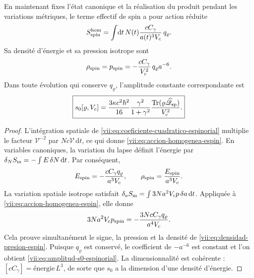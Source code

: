 \begin{theorem}
\label{vii:thm:amplitud-material-explicita}
En maintenant fixes l'état canonique et la réalisation du produit
pendant les variations métriques, le terme effectif de spin a pour
action réduite
\begin{equation}
 S_{\rm spin}^{\rm hom}
 =\int\!\mathrm dt\,N(t)
       \frac{cC_\gamma}{a(t)^3V_c}\,q_\varrho.
 \label{vii:eq:accion-homogenea-espin}
\end{equation}
Sa densité d'énergie et sa pression isotrope sont
\begin{equation}
 \rho_{\rm spin}=p_{\rm spin}
 =-\frac{cC_\gamma}{V_c^2}\,q_\varrho a^{-6}.
 \label{vii:eq:densidad-presion-espin}
\end{equation}
Dans toute évolution qui conserve \(q_\varrho\), l'amplitude constante correspondante est
\begin{equation}
 \boxed{\displaystyle
 s_0[\varrho,V_c]
 =\frac{3\kappa c^2\hbar^2}{16}
    \frac{\gamma^2}{1+\gamma^2}
    \frac{\operatorname{Tr}
       (\varrho\widehat{\mathscr Q}_{\rm sp})}{V_c^2}.}
 \label{vii:eq:amplitud-s0-espinorial}
\end{equation}
\end{theorem}
\begin{proof}
L'intégration spatiale de
\eqref{vii:eq:coeficiente-cuadratico-espinorial} multiplie le
facteur \(\mathcal V^{-2}\) par
\(Nc\mathcal V\,\mathrm dt\), ce qui donne
\eqref{vii:eq:accion-homogenea-espin}. En variables canoniques,
la variation du lapse définit l'énergie par
\(\delta_N S_{\rm m}=-\int E\,\delta N\,\mathrm dt\).
Par conséquent,
\[
 E_{\rm spin}=-\frac{cC_\gamma q_\varrho}{a^3V_c},
 \qquad \rho_{\rm spin}=\frac{E_{\rm spin}}{a^3V_c}.
\]
La variation spatiale isotrope satisfait \(\delta_a S_{\rm m}=\int3Na^2V_c p\,\delta a\,\mathrm dt\). Appliquée à \eqref{vii:eq:accion-homogenea-espin}, elle donne
\[
 3Na^2V_c p_{\rm spin}
 =-\frac{3NcC_\gamma q_\varrho}{a^4V_c}.
\]
Cela prouve simultanément le signe, la pression et la densité de \eqref{vii:eq:densidad-presion-espin}. Puisque \(q_\varrho\) est conservé, le coefficient de \(-a^{-6}\) est constant et l'on obtient \eqref{vii:eq:amplitud-s0-espinorial}. La dimensionnalité est cohérente : \([cC_\gamma]=\mathrm{énergie}\,L^3\), de sorte que \(s_0\) a la dimension d'une densité d'énergie.
\end{proof}

